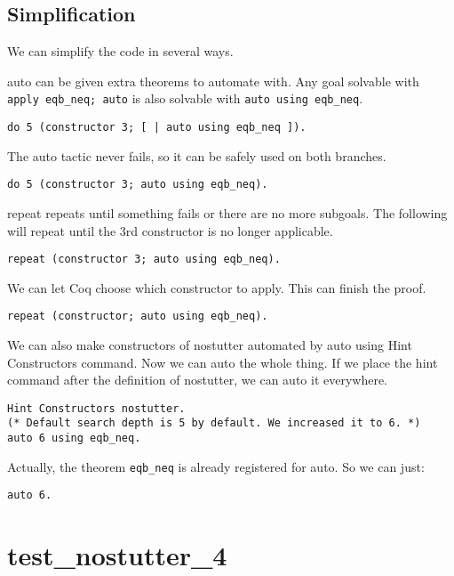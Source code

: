 \documentclass[12pt]{article}
\begin{document}
\subsection{Simplification}

We can simplify the code in several ways.

auto can be given extra theorems to automate with. Any goal solvable with {\tt apply eqb\_neq; auto} is also solvable with {\tt auto using eqb\_neq}.

\begin{verbatim}
do 5 (constructor 3; [ | auto using eqb_neq ]).
\end{verbatim}

The auto tactic never fails, so it can be safely used on both branches.

\begin{verbatim}
do 5 (constructor 3; auto using eqb_neq).
\end{verbatim}

repeat repeats until something fails or there are no more subgoals. The following will repeat until the 3rd constructor is no longer applicable.

\begin{verbatim}
repeat (constructor 3; auto using eqb_neq).
\end{verbatim}

We can let Coq choose which constructor to apply. This can finish the proof.

\begin{verbatim}
repeat (constructor; auto using eqb_neq).
\end{verbatim}

We can also make constructors of nostutter automated by auto using Hint Constructors command. Now we can auto the whole thing. If we place the hint command after the definition of nostutter, we can auto it everywhere.

\begin{verbatim}
Hint Constructors nostutter.
(* Default search depth is 5 by default. We increased it to 6. *)
auto 6 using eqb_neq.
\end{verbatim}

Actually, the theorem {\tt eqb\_neq} is already registered for auto. So we can just:

\begin{verbatim}
auto 6.
\end{verbatim}

\section{test\_nostutter\_4}
\end{document}
